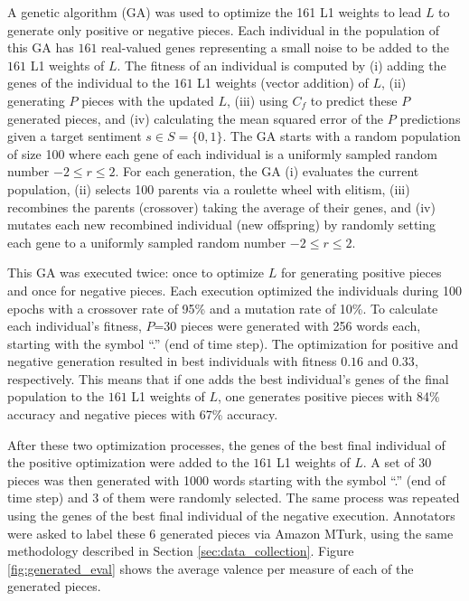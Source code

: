 A genetic algorithm (GA) was used to optimize the 161 L1 weights to lead $L$ to generate only positive or negative pieces. Each individual in the population of this GA has $161$ real-valued genes representing a small noise to be added to the $161$ L1 weights of $L$. The fitness of an individual is computed by (i) adding the genes of the individual to the $161$ L1 weights (vector addition) of $L$, (ii) generating $P$ pieces with the updated $L$, (iii) using $C_f$ to predict these $P$ generated pieces, and (iv) calculating the mean squared error of the $P$ predictions given a target sentiment $s \in S = \{0, 1\}$. The GA starts with a random population of size 100 where each gene of each individual is a uniformly sampled random number $-2 \leq r \leq 2$. For each generation, the GA (i) evaluates the current population, (ii) selects 100 parents via a roulette wheel with elitism, (iii) recombines the parents (crossover) taking the average of their genes, and (iv) mutates each new recombined individual (new offspring) by randomly setting each gene to a uniformly sampled random number $-2 \leq r \leq 2$.

This GA was executed twice: once to optimize $L$ for generating positive pieces and once for negative pieces. Each execution optimized the individuals during 100 epochs with a crossover rate of 95\% and a mutation rate of 10\%. To calculate each individual's fitness, $P$=30 pieces were generated with 256 words each, starting with the symbol ``.'' (end of time step). The optimization for positive and negative generation resulted in best individuals with fitness $0.16$ and $0.33$, respectively. This means that if one adds the best individual's genes of the final population to the $161$ L1 weights of $L$, one generates positive pieces with 84\% accuracy and negative pieces with 67\% accuracy.

After these two optimization processes, the genes of the best final individual of the positive optimization were added to the $161$ L1 weights of $L$. A set of 30 pieces was then generated with 1000 words starting with the symbol ``.'' (end of time step) and 3 of them were randomly selected. The same process was repeated using the genes of the best final individual of the negative execution. Annotators were asked to label these 6 generated pieces via Amazon MTurk, using the same methodology described in Section \ref{sec:data_collection}. Figure \ref{fig:generated_eval} shows the average valence per measure of each of the generated pieces.

